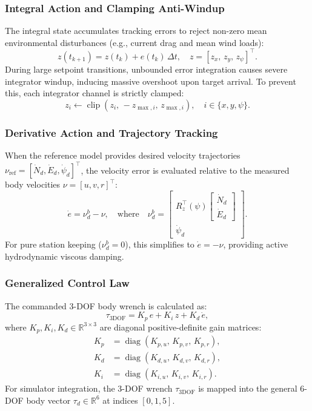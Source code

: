 \documentclass[10pt,conference]{IEEEtran}
\begin{document}
\subsubsection{Integral Action and Clamping Anti-Windup}
The integral state accumulates tracking errors to reject non-zero mean environmental disturbances (e.g., current drag and mean wind loads):
\begin{equation}
z(t_{k+1}) = z(t_k) + e(t_k)\,\Delta t, \quad z = [z_x,\, z_y,\, z_\psi]^\top.
\end{equation}
During large setpoint transitions, unbounded error integration causes severe integrator windup, inducing massive overshoot upon target arrival. To prevent this, each integrator channel is strictly clamped:
\begin{equation}
z_i \leftarrow \operatorname{clip}(z_i,\, -z_{\max,i},\, z_{\max,i}), \quad i \in \{x, y, \psi\}.
\end{equation}

\subsubsection{Derivative Action and Trajectory Tracking}
When the reference model provides desired velocity trajectories $\nu_{\mathrm{ref}} = [\dot{N}_d, \dot{E}_d, \dot{\psi}_d]^\top$, the velocity error is evaluated relative to the measured body velocities $\nu = [u, v, r]^\top$:
\begin{equation}
\dot{e} = \nu_d^b - \nu, \quad \text{where} \quad 
\nu_d^b = \begin{bmatrix} R_z^\top(\psi) \begin{bmatrix} \dot{N}_d \\ \dot{E}_d \end{bmatrix} \\ \dot{\psi}_d \end{bmatrix}.
\end{equation}
For pure station keeping ($\nu_d^b = 0$), this simplifies to $\dot{e} = -\nu$, providing active hydrodynamic viscous damping.

\subsubsection{Generalized Control Law}
The commanded 3-DOF body wrench is calculated as:
\begin{equation}
\tau_{3\mathrm{DOF}} = K_p \, e + K_i \, z + K_d \, \dot{e},
\label{eq:pid_law}
\end{equation}
where $K_p, K_i, K_d \in \mathbb{R}^{3 \times 3}$ are diagonal positive-definite gain matrices:
\begin{align}
K_p &= \operatorname{diag}(K_{p,u},\, K_{p,v},\, K_{p,r}), \\
K_d &= \operatorname{diag}(K_{d,u},\, K_{d,v},\, K_{d,r}), \\
K_i &= \operatorname{diag}(K_{i,u},\, K_{i,v},\, K_{i,r}).
\end{align}
For simulator integration, the 3-DOF wrench $\tau_{3\mathrm{DOF}}$ is mapped into the general 6-DOF body vector $\tau_d \in \mathbb{R}^6$ at indices $[0, 1, 5]$.
\end{document}
